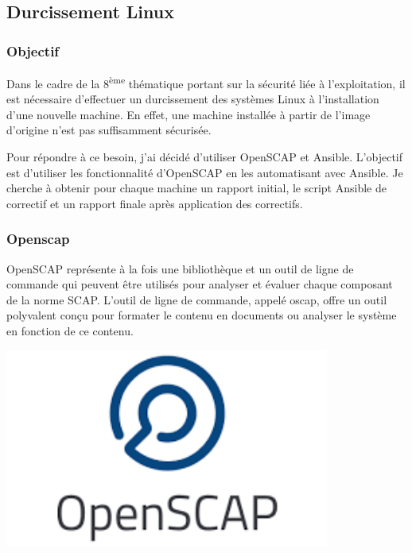 \documentclass[12pt]{article}
\begin{document}
\newpage
\subsection{Durcissement Linux}
\subsubsection{Objectif}
Dans le cadre de la 8\textsuperscript{ème} thématique portant sur la sécurité liée à l'exploitation, il est nécessaire d'effectuer un durcissement des systèmes Linux à l'installation d'une nouvelle machine. 
En effet, une machine installée à partir de l'image d'origine n'est pas suffisamment sécurisée.

Pour répondre à ce besoin, j'ai décidé d'utiliser OpenSCAP et Ansible. 
L'objectif est d'utiliser les fonctionnalité d'OpenSCAP en les automatisant avec Ansible.
Je cherche à obtenir pour chaque machine un rapport initial, le script Ansible de correctif et un rapport finale après application des correctifs. 

\subsubsection{Openscap}
\noindent%
\begin{minipage}{.7\textwidth}%
OpenSCAP représente à la fois une bibliothèque et un outil de ligne de commande qui peuvent être utilisés pour analyser et évaluer chaque composant de la norme SCAP. 
L'outil de ligne de commande, appelé oscap, offre un outil polyvalent conçu pour formater le contenu en documents ou analyser le système en fonction de ce contenu. \\
\end{minipage}%
\hfill
\begin{minipage}{.3\textwidth}%
\begin{center}
\includegraphics[width=0.8\textwidth]{src/logo_openscap.png}
\end{center}
\end{minipage}%
\end{document}
